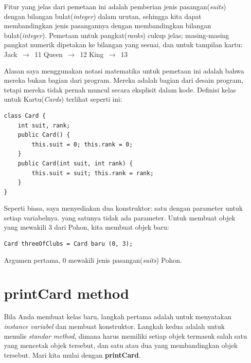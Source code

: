 \noindent Fitur yang jelas dari pemetaan ini adalah pemberian jenis pasangan(\textit{suits}) dengan bilangan bulat(\textit{integer}) dalam urutan, sehingga kita dapat membandingkan jenis pasangannya dengan membandingkan bilangan bulat(\textit{integer}). Pemetaan untuk pangkat(\textit{ranks}) cukup jelas; masing-masing pangkat numerik dipetakan ke bilangan yang sesuai, dan untuk tampilan kartu: 
\noindent 
\newline Jack $\,\to\,$ 11 
\newline Queen $\,\to\,$ 12 
\newline King  $\,\to\,$ 13 \par

\noindent Alasan saya menggunakan notasi matematika untuk pemetaan ini adalah bahwa mereka bukan bagian dari program. Mereka adalah bagian dari desain program, tetapi mereka tidak pernah muncul secara eksplisit dalam kode. Definisi kelas untuk Kartu(\textit{Cards}) terlihat seperti ini:

\begin{lstlisting}
class Card { 
    int suit, rank;
    public Card() { 
        this.suit = 0; this.rank = 0; 
    }
    public Card(int suit, int rank) { 
        this.suit = suit; this.rank = rank; 
    }
}

\end{lstlisting} \par 

\noindent Seperti biasa, saya menyediakan dua konstruktor: satu dengan parameter untuk setiap variabelnya. yang satunya tidak ada parameter.
\noindent 
\newline
\newline Untuk membuat objek yang mewakili 3 dari Pohon, kita membuat objek baru: 

\begin{lstlisting}
Card threeOfClubs = Card baru (0, 3); 
\end{lstlisting}

\noindent Argumen pertama, 0 mewakili jenis pasangan(\textit{suits}) Pohon.

\section{printCard method}
Bila Anda membuat kelas baru, langkah pertama adalah untuk menyatakan \textit{instance variabel} dan membuat konstruktor. Langkah kedua adalah untuk menulis \textit{standar method}, dimana harus memiliki setiap objek termasuk salah satu yang mencetak objek tersebut, dan satu atau dua yang membandingkan objek tersebut. Mari kita mulai dengan \textbf{printCard}.
 
